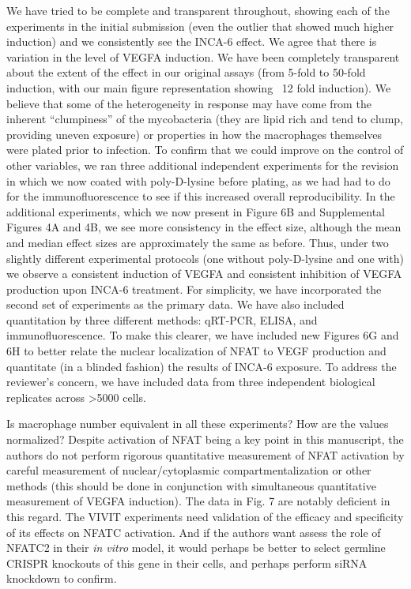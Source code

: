 \begin{description}[style=multiline, labelwidth=\widthof{Reviewer \#2:   }, font=\normalfont, leftmargin=\labelwidth, align=right]
\item[Response: ] \quad We have tried to be complete and transparent throughout, showing each of the experiments in the initial submission (even the outlier that showed much higher induction) and we consistently see the INCA\hyp{}6 effect. We agree that there is variation in the level of VEGFA induction. We have been completely transparent about the extent of the effect in our original assays (from 5\hyp{}fold to 50\hyp{}fold induction, with our main figure representation showing ~12 fold induction). We believe that some of the heterogeneity in response may have come from the inherent “clumpiness” of the mycobacteria (they are lipid rich and tend to clump, providing uneven exposure) or properties in how the macrophages themselves were plated prior to infection. To confirm that we could improve on the control of other variables, we ran three additional independent experiments for the revision in which we now coated with poly\hyp{}D\hyp{}lysine before plating, as we had had to do for the immunofluorescence to see if this increased overall reproducibility. In the additional experiments, which we now present in Figure 6B and Supplemental Figures 4A and 4B, we see more consistency in the effect size, although the mean and median effect sizes are approximately the same as before.  Thus, under two slightly different experimental protocols (one without poly\hyp{}D\hyp{}lysine and one with) we observe a consistent induction of VEGFA and consistent inhibition of VEGFA production upon INCA\hyp{}6 treatment. For simplicity, we have incorporated the second set of experiments as the primary data. We have also included quantitation by three different methods: qRT\hyp{}PCR, ELISA, and immunofluorescence. To make this clearer, we have included new Figures 6G and 6H to better relate the nuclear localization of NFAT to VEGF production and quantitate (in a blinded fashion) the results of INCA\hyp{}6 exposure. To address the reviewer’s concern, we have included data from three independent biological replicates across >5000 cells.

\item[Reviewer \#2: ] \quad Is macrophage number equivalent in all these experiments? How are the values normalized? Despite activation of NFAT being a key point in this manuscript, the authors do not perform rigorous quantitative measurement of NFAT activation by careful measurement of nuclear/cytoplasmic compartmentalization or other methods (this should be done in conjunction with simultaneous quantitative measurement of VEGFA induction). The data in Fig. 7 are notably deficient in this regard. The VIVIT experiments need validation of the efficacy and specificity of its effects on NFATC activation. And if the authors want assess the role of NFATC2 in their \textit{in vitro} model, it would perhaps be better to select germline CRISPR knockouts of this gene in their cells, and perhaps perform siRNA knockdown to confirm. 


\end{description}
